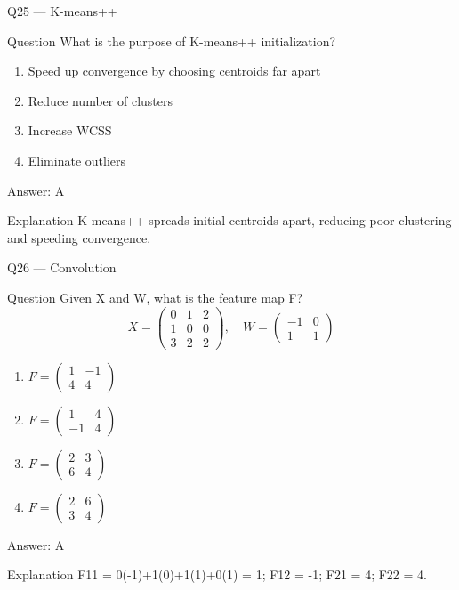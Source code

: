 \documentclass[aspectratio=169,8pt]{beamer}
\begin{document}
	\begin{frame}{Q25 --- K-means++}
		\begin{block}{Question}
			What is the purpose of K-means++ initialization?
		\end{block}
		\begin{enumerate}[label=\Alph*.]
			\item Speed up convergence by choosing centroids far apart
			\item Reduce number of clusters
			\item Increase WCSS
			\item Eliminate outliers
		\end{enumerate}
		\begin{exampleblock}{Answer: A}
		\end{exampleblock}
		\begin{block}{Explanation}
			K-means++ spreads initial centroids apart, reducing poor clustering and speeding convergence.
		\end{block}
	\end{frame}
	
	
	
	
	\begin{frame}{Q26 --- Convolution}
		\begin{block}{Question}
			Given X and W, what is the feature map F?
			\[
			X = \begin{pmatrix} 0 & 1 & 2 \\ 1 & 0 & 0 \\ 3 & 2 & 2 \end{pmatrix}, \quad
			W = \begin{pmatrix} -1 & 0 \\ 1 & 1 \end{pmatrix}
			\]
		\end{block}
		\begin{enumerate}[label=\Alph*.]
			\item $F = \begin{pmatrix} 1 & -1 \\ 4 & 4 \end{pmatrix}$
			\item $F = \begin{pmatrix} 1 & 4 \\ -1 & 4 \end{pmatrix}$
			\item $F = \begin{pmatrix} 2 & 3 \\ 6 & 4 \end{pmatrix}$
			\item $F = \begin{pmatrix} 2 & 6 \\ 3 & 4 \end{pmatrix}$
		\end{enumerate}
		\begin{exampleblock}{Answer: A}
		\end{exampleblock}
		\begin{block}{Explanation}
			F11 = 0(-1)+1(0)+1(1)+0(1) = 1; F12 = -1; F21 = 4; F22 = 4.
		\end{block}
	\end{frame}
	
\end{document}
